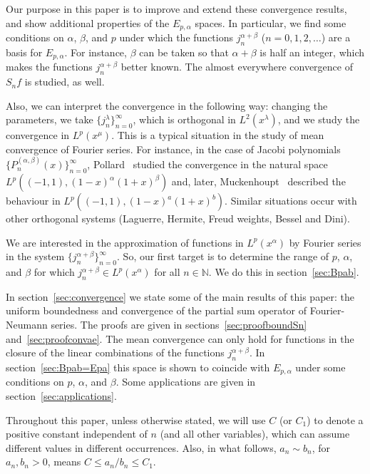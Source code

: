 \documentclass[reqno]{amsart}
\theoremstyle{plain}
\theoremstyle{definition}
\theoremstyle{remark}
\begin{document}
Our purpose in this paper is to improve and extend these convergence
results, and show additional properties of the $E_{p,\alpha}$ spaces.
In particular, we find some conditions on $\alpha$, $\beta$, and $p$ under
which the functions $j_n^{\alpha+\beta}$ ($n=0,1,2,\dots$) are a basis for
$E_{p,\alpha}$. For instance, $\beta$ can be taken so that $\alpha + \beta$ is
half an integer, which makes the functions $j_n^{\alpha+\beta}$ better known.
The almost everywhere convergence of $S_nf$ is studied, as well.

Also, we can interpret the convergence in the following way:
changing the parameters, we take
$\{j_n^{\lambda}\}_{n=0}^\infty$, which is orthogonal in $L^2(x^\lambda)$,
and we study the convergence in $L^p(x^\mu)$. This is a typical situation
in the study of mean convergence of Fourier series. For instance, in the case
of Jacobi polynomials $\{P_n^{(\alpha,\beta)}(x)\}_{n=0}^\infty$,
Pollard~\cite{Pol-III} studied the convergence in the natural space
$L^p((-1,1),(1-x)^\alpha(1+x)^\beta)$ and, later, Muckenhoupt~\cite{Muck}
described the behaviour in $L^p((-1,1),(1-x)^a(1+x)^b)$. Similar situations
occur with other orthogonal systems (Laguerre, Hermite, Freud weights,
Bessel and Dini).

We are interested in the approximation of functions in $L^p(x^\alpha)$
by Fourier series in the system $\{j_n^{\alpha+\beta}\}_{n=0}^\infty$.
So, our first target is to determine the range of $p$, $\alpha$, and $\beta$
for which $j_n^{\alpha+\beta} \in L^p(x^\alpha)$ for all $n \in \mathbb{N}$.
We do this in section~\ref{sec:Bpab}.

In section~\ref{sec:convergence} we state some of the main results of this
paper: the uniform boundedness and convergence of the partial sum operator of
Fourier-Neumann series. The proofs are given in sections~\ref{sec:proofboundSn}
and~\ref{sec:proofconvae}. The mean convergence can only hold for functions in
the closure of the linear combinations of the functions $j_n^{\alpha+\beta}$.
In section~\ref{sec:Bpab=Epa} this space is shown to coincide with
$E_{p,\alpha}$ under some conditions on $p$, $\alpha$, and $\beta$. Some
applications are given in section~\ref{sec:applications}.

Throughout this paper, unless otherwise stated, we will use $C$ (or $C_1$)
to denote a positive constant independent of $n$ (and all other variables),
which can assume different values in different occurrences. Also, in what
follows, $a_n \sim b_n$, for $a_n, b_n>0$, means $C \le a_n/b_n \le C_1$.
\end{document}
